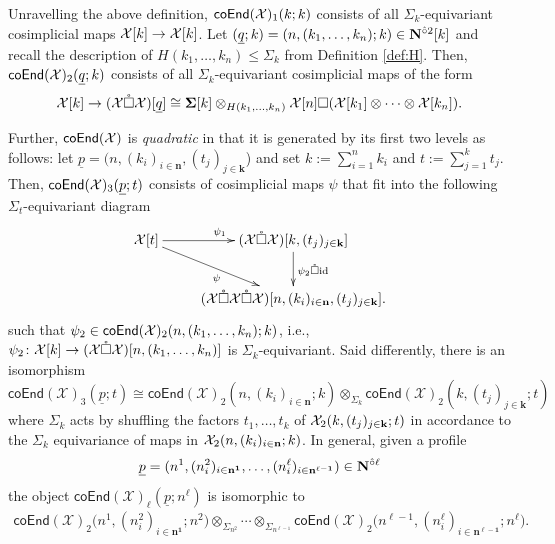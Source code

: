 \begin{example} Unravelling the above definition, $\mathsf{coEnd}(\mathcal{X})_1(k;k)$ consists of all $\Sigma_k$-equivariant cosimplicial maps $\mathcal{X}[k] \to \mathcal{X}[k]$. Let $(\underline{q};k)=(n,(k_1,\dots,k_n);k)\in \mathbf{N}^{\hat{\circ}2}[k]$ and recall the description of $H(k_1,\dots,k_n)\leq \Sigma_k$ from Definition \ref{def:H}. Then, $\mathsf{coEnd}(\mathcal{X})_2(\underline{q};k)$ consists of all $\Sigma_k$-equivariant cosimplicial maps of the form \[ 
    \mathcal{X}[k] \to (\mathcal{X}\mathring{\square} \mathcal{X}) [\underline{q}]\cong \mathbf{\Sigma}[k] \otimes_{H(k_1,\dots,k_n)} \mathcal{X}[n] \square (\mathcal{X}[k_1] \otimes\cdots \otimes \mathcal{X}[k_n]).
\] 

Further, $\mathsf{coEnd}(\mathcal{X})$ is \textit{quadratic} in that it is generated by its first two levels as follows: let $\underline{p}=(n, (k_i)_{i\in \mathbf{n}}, (t_j)_{j\in \mathbf{k}}$) and set $k:=\sum_{i=1}^n k_i$ and $t:=\sum_{j=1}^k t_j$. Then, $\mathsf{coEnd}(\mathcal{X})_3(\underline{p};t)$ consists of cosimplicial maps $\psi$ that fit into the following $\Sigma_t$-equivariant diagram \begin{equation*}
\xymatrix{
    \Cal{X} [t] \ar[r]^{\psi_1} \ar[dr]_{\psi} & 
    (\Cal{X}\boxcirc\Cal{X})[k, (t_j)_{j\in\mathbf{k}}] \ar[d]^{\psi_2\boxcirc \textrm{id}} 
    \\ 
    & (\Cal{X}\boxcirc\Cal{X}\boxcirc \Cal{X}) [ n, (k_i)_{i\in\mathbf{n}}, (t_j)_{j\in\mathbf{k}}].
    }
\end{equation*}
such that $\psi_2\in \mathsf{coEnd}(\mathcal{X})_2(n,(k_1,\dots,k_n);k)$, i.e., $\psi_2\colon \mathcal{X}[k]\to (\mathcal{X}\mathring{\square} \mathcal{X})[n,(k_1,\dots,k_n)]$ is $\Sigma_k$-equivariant. Said differently, there is an isomorphism \[
    \mathsf{coEnd}(\mathcal{X})_3(\underline{p};t)\cong  \mathsf{coEnd}(\mathcal{X})_2(n, (k_i)_{i\in\mathbf{n}};k) \otimes_{\Sigma_k} \mathsf{coEnd}(\mathcal{X})_2(k, (t_j)_{j\in\mathbf{k}}; t)
\] where $\Sigma_k$ acts by shuffling the factors $t_1,\dots,t_k$ of $\mathcal{X}_2(k, (t_j)_{j\in\mathbf{k}};t)$ in accordance to the $\Sigma_k$ equivariance of maps in $\mathcal{X}_2(n, (k_i)_{i\in\mathbf{n}};k)$. In general, given a profile \[\underline{p}=(n^1,(n^2_i)_{i\in\mathbf{n^1}}, \dots, (n^{\ell}_i)_{i\in \mathbf{n^{\ell-1}}}) \in\mathbf{N}^{\hat{\circ}\ell}\] the object $\mathsf{coEnd}(\mathcal{X})_{\ell} (\underline{p};n^{\ell})$ is isomorphic to  \begin{align} \label{eq:coEnd-quad}
     \mathsf{coEnd}(\mathcal{X})_2\big(n^1, (n^2_i)_{i\in \mathbf{n^1}};n^2\big) \otimes_{\Sigma_{n^2}}  \cdots   \otimes_{\Sigma_{n^{\ell-1}}} \mathsf{coEnd}(\mathcal{X})_2\big(n^{\ell-1}, (n^{\ell}_i)_{i\in\mathbf{n^{\ell-1}}};n^{\ell}\big).\end{align} \end{example}

